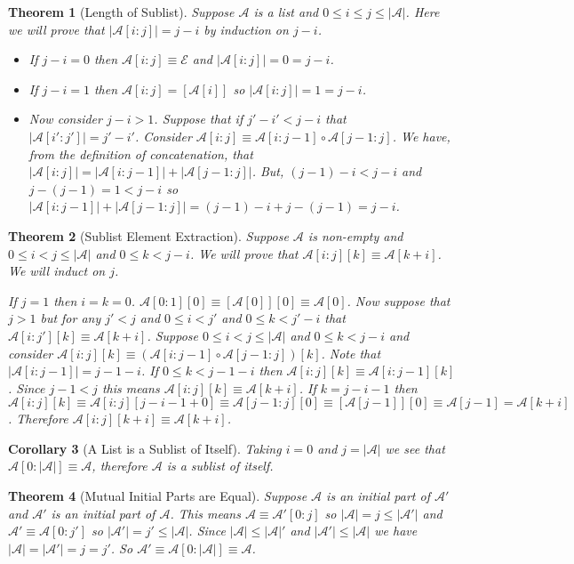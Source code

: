 \documentclass[12pt]{article}
\theoremstyle{break}
\theoremstyle{break}
\newtheorem{theorem}{Theorem}[section]
\theoremstyle{break}
\newtheorem{corollary}[theorem]{Corollary}
\theoremstyle{break}
\newcommand{\mc}[1]{\mathcal{#1}}
\begin{document}
\begin{theorem}[Length of Sublist]

Suppose $\mc{A}$ is a list and $0 \le i \le j \le |\mc{A}|$. Here we will prove that $|\mc{A}[i:j]| = j-i$ by induction on $j-i$.

\begin{itemize}
\item{If $j-i=0$ then $\mc{A}[i:j] \equiv \mc{E}$ and $|\mc{A}[i:j]|=0 = j-i$.}
\item{If $j-i=1$ then $\mc{A}[i:j] = [\mc{A}[i]]$ so $|\mc{A}[i:j]| = 1 = j-i$.}
\item{Now consider $j-i > 1$.
Suppose that if $j'-i' < j-i$ that $|\mc{A}[i':j']| = j'-i'$.
Consider $\mc{A}[i:j] \equiv \mc{A}[i:j-1] \circ \mc{A}[j-1:j]$.
We have, from the definition of concatenation, that $|\mc{A}[i:j]| = |\mc{A}[i:j-1]| + |\mc{A}[j-1:j]|$.
But, $(j-1) - i < j-i$ and $j - (j-1) = 1 < j-i$ so $|\mc{A}[i:j-1]| + |\mc{A}[j-1:j]| = (j-1)-i + j - (j-1) = j-i$.}
\end{itemize}
\end{theorem}

\begin{theorem}[Sublist Element Extraction]
\label{thm:sublistextraction}
Suppose $\mc{A}$ is non-empty and $0 \le i < j \le |\mc{A}|$ and $0 \le k < j-i$.
We will prove that $\mc{A}[i:j][k] \equiv \mc{A}[k + i]$. We will induct on $j$. 

If $j=1$ then $i=k=0$. $\mc{A}[0:1][0] \equiv [\mc{A}[0]][0] \equiv \mc{A}[0]$. Now suppose that $j>1$ but for any $j'<j$ and $0 \le i < j'$ and $0 \le k < j'-i$ that $\mc{A}[i:j'][k]\equiv \mc{A}[k+i]$. Suppose $0 \le i < j \le |\mc{A}|$ and $0 \le k < j-i$ and consider $\mc{A}[i:j][k] \equiv (\mc{A}[i:j-1]\circ\mc{A}[j-1:j])[k]$. Note that $|\mc{A}[i:j-1]| = j-1-i$. If $0 \le k < j-1-i$ then $\mc{A}[i:j][k] \equiv \mc{A}[i:j-1][k]$. Since $j-1<j$ this means $\mc{A}[i:j][k] \equiv \mc{A}[k+i]$. If $k=j-i-1$ then $\mc{A}[i:j][k] \equiv \mc{A}[i:j][j-i-1 + 0] \equiv \mc{A}[j-1:j][0] \equiv [\mc{A}[j-1]][0] \equiv \mc{A}[j-1] = \mc{A}[k+i]$. Therefore $\mc{A}[i:j][k+i] \equiv \mc{A}[k+i]$.
\end{theorem}

\begin{corollary}[A List is a Sublist of Itself]
Taking $i=0$ and $j = |\mc{A}|$ we see that $\mc{A}[0:|\mc{A}|] \equiv \mc{A}$, therefore $\mc{A}$ is a sublist of itself.
\end{corollary}

\begin{theorem}[Mutual Initial Parts are Equal]
Suppose $\mc{A}$ is an initial part of $\mc{A}'$ and $\mc{A}'$ is an initial part of $\mc{A}$. 
This means $\mc{A} \equiv \mc{A}'[0:j]$ so $|\mc{A}| = j\le|\mc{A}'|$ and $\mc{A}'\equiv \mc{A}[0:j']$ so $|\mc{A}'| = j'\le |\mc{A}|$. 
Since $|\mc{A}|\le |\mc{A}|'$ and $|\mc{A}'| \le |\mc{A}|$ we have $|\mc{A}| = |\mc{A}'| = j = j'$.
So $\mc{A}' \equiv \mc{A}[0:|\mc{A}|] \equiv \mc{A}$.
\end{theorem}
\end{document}
